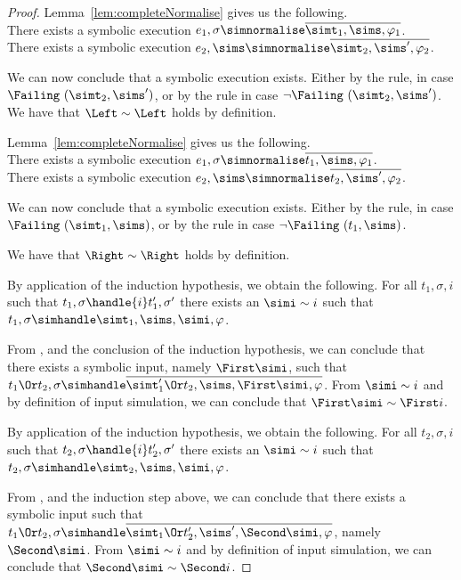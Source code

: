 \begin{proof}
    {
      Lemma~\ref{lem:completeNormalise} gives us the following.\\
      There exists a symbolic execution $e_1,\sigma\simnormalise \overline{\simt_1,\sims,\phi_1}$.\\
      There exists a symbolic execution $e_2,\sims\simnormalise \overline{\simt_2,\sims',\phi_2}$.

      We can now conclude that a symbolic execution exists.
      Either by the  rule, in case $\Failing\ (\simt_2,\sims')$, or by the  rule in case $\neg\Failing\ (\simt_2,\sims')$.
      We have that $\Left\sim \Left$ holds by definition.
    }
    {
    Lemma~\ref{lem:completeNormalise} gives us the following.\\
    There exists a symbolic execution $e_1,\sigma\simnormalise\overline{ t_1,\sims,\phi_1}$.\\
    There exists a symbolic execution $e_2,\sims\simnormalise\overline{ t_2,\sims',\phi_2}$.

    We can now conclude that a symbolic execution exists.
    Either by the  rule, in case $\Failing\ (\simt_1,\sims)$, or by the  rule in case $\neg\Failing\ (t_1,\sims)$.

    We have that $\Right\sim \Right$ holds by definition.
    }

    {
    By application of the induction hypothesis, we obtain the following.
    For all $t_1,\sigma,i$ such that $t_1,\sigma\handle{i}t_1',\sigma'$ there exists an $\simi\sim i$ such that $t_1,\sigma\simhandle \simt_1,\sims,\simi,\phi$.

    From , and the conclusion of the induction hypothesis,
    we can conclude that there exists a symbolic input, namely $\First \simi$, such that $t_1\Or t_2,\sigma\simhandle\overline{\simt_1'\Or t_2,\sims,\First\simi,\phi}$.
    From $\simi\sim i$ and by definition of input simulation, we can conclude that $\First \simi\sim \First i$.
    }

    {
    By application of the induction hypothesis, we obtain the following.
    For all $t_2,\sigma,i$ such that $t_2,\sigma\handle{i}t_2',\sigma'$ there exists an $\simi\sim i$ such that $t_2,\sigma\simhandle\simt_2,\sims,\simi,\phi$.

    From , and the induction step above,
    we can conclude that there exists a symbolic input such that $t_1\Or t_2,\sigma\simhandle\overline{\simt_1\Or t_2',\sims',\Second\simi,\phi}$, namely $\Second \simi$.
    From $\simi\sim i$ and by definition of input simulation, we can conclude that $\Second \simi\sim \Second i$.
    }


\end{proof}
